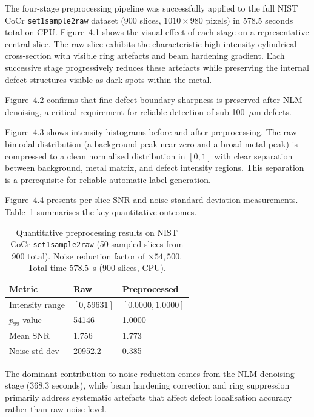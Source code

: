 The four-stage preprocessing pipeline was successfully applied to the full NIST CoCr
\texttt{set1sample2raw} dataset (900 slices, $1010 \times 980$ pixels) in 578.5 seconds total on
CPU. Figure~4.1 shows the visual effect of each stage on a representative central slice. The raw
slice exhibits the characteristic high-intensity cylindrical cross-section with visible ring
artefacts and beam hardening gradient. Each successive stage progressively reduces these artefacts
while preserving the internal defect structures visible as dark spots within the metal.

Figure~4.2 confirms that fine defect boundary sharpness is preserved after NLM denoising, a critical
requirement for reliable detection of sub-100~$\mu$m defects.

Figure~4.3 shows intensity histograms before and after preprocessing. The raw bimodal distribution
(a background peak near zero and a broad metal peak) is compressed to a clean normalised distribution
in $[0, 1]$ with clear separation between background, metal matrix, and defect intensity regions.
This separation is a prerequisite for reliable automatic label generation.

Figure~4.4 presents per-slice SNR and noise standard deviation measurements. Table~\ref{tab:snr_51}
summarises the key quantitative outcomes.

\begin{table}[htbp]
\centering
\caption{Quantitative preprocessing results on NIST CoCr \texttt{set1sample2raw} (50 sampled slices
  from 900 total). Noise reduction factor of $\times 54{,}500$. Total time 578.5~s (900 slices,
  CPU).}
\label{tab:snr_51}
\begin{tabular}{lll}
\toprule
\textbf{Metric} & \textbf{Raw} & \textbf{Preprocessed} \\
\midrule
Intensity range & $[0, 59631]$ & $[0.0000, 1.0000]$ \\
$p_{99}$ value & 54146 & 1.0000 \\
Mean SNR & 1.756 & 1.773 \\
Noise std dev & 20952.2 & 0.385 \\
\bottomrule
\end{tabular}
\end{table}

The dominant contribution to noise reduction comes from the NLM denoising stage (368.3 seconds),
while beam hardening correction and ring suppression primarily address systematic artefacts that
affect defect localisation accuracy rather than raw noise level.

